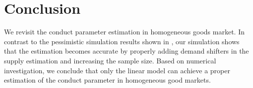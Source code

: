 \documentclass[11pt, a4paper]{article}
\begin{document}



    
\section{Conclusion}

We revisit the conduct parameter estimation in homogeneous goods market. In contrast to the pessimistic simulation results shown in \cite{perloff2012collinearity}, our simulation shows that the estimation becomes accurate by properly adding demand shifters in the supply estimation and increasing the sample size. Based on numerical investigation, we conclude that only the linear model can achieve a proper estimation of the conduct parameter in homogeneous good markets. 




\end{document}
